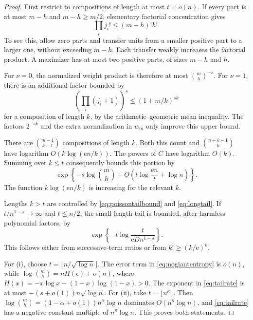 \documentclass[11pt,a4paper]{article}
\theoremstyle{definition}
\theoremstyle{remark}
\newcommand{\ee}{\mathrm e}
\numberwithin{equation}{section}
\begin{document}
\begin{proof}
First restrict to compositions of length at most $t=o(n)$. If every
part is at most $m-h$ and $m-h\ge m/2$, elementary factorial
concentration gives
\begin{equation}
 \prod_i j_i!\le(m-h)!h!.
 \label{eq:capconcentration}
\end{equation}
To see this, allow zero parts and transfer units from a smaller positive
part to a larger one, without exceeding $m-h$. Each transfer weakly
increases the factorial product. A maximizer has at most two positive
parts, of sizes $m-h$ and $h$.

For $\nu=0$, the normalized weight product is therefore at most
$\binom mh^{-s}$. For $\nu=1$, there is an additional factor bounded
by
\[
 \left(\prod_i(j_i+1)\right)^s
 \le (1+m/k)^{sk}
\]
for a composition of length $k$, by the arithmetic--geometric mean
inequality. The factors $2^{-sk}$ and the extra normalization in $w_m$
only improve this upper bound.

There are $\binom{m-1}{k-1}$ compositions of length $k$. Both this
count and $\binom{n+k-1}{k}$ have logarithm
$O(k\log(\ee n/k))$. The powers of $C$ have logarithm $O(k)$.
Summing over $k\le t$ consequently bounds this portion by
\begin{equation}
 \exp\left\{-s\log\binom mh+
       O\left(t\log\frac{\ee n}{t}+\log n\right)\right\}.
 \label{eq:nogiantentropy}
\end{equation}
The function $k\log(\ee n/k)$ is increasing for the relevant $k$.

Lengths $k>t$ are controlled by \eqref{eq:poissontailbound} and
\eqref{eq:longtail}. If $t/n^{1-s}\to\infty$ and $t\le n/2$, the
small-length tail is bounded, after harmless polynomial factors, by
\begin{equation}
 \exp\left\{-t\log\frac{t}{\ee D n^{1-s}}\right\}.
 \label{eq:tailrate}
\end{equation}
This follows either from successive-term ratios or from $k!\ge(k/\ee)^k$.

For (i), choose $t=\lfloor n/\sqrt{\log n}\rfloor$.
The error term in \eqref{eq:nogiantentropy} is $o(n)$, while
$\log\binom mh=nH(\epsilon)+o(n)$, where
$H(x)=-x\log x-(1-x)\log(1-x)>0$. The exponent in
\eqref{eq:tailrate} is at most $-(s+o(1))n\sqrt{\log n}$.
For (ii), take $t=\lfloor n^\kappa\rfloor$.
Then $\log\binom mh=(1-\alpha+o(1))n^\alpha\log n$ dominates
$O(n^\kappa\log n)$, and \eqref{eq:tailrate} has a negative constant
multiple of $n^\kappa\log n$. This proves both statements.
\end{proof}
\end{document}
